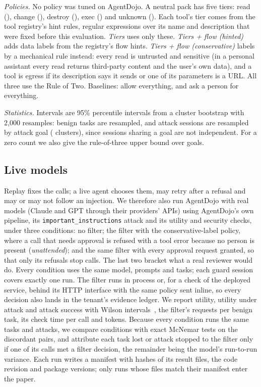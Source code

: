 \emph{Policies.} No policy was tuned on AgentDojo. A neutral pack has five tiers: read (), change (), destroy (), exec () and unknown (). Each tool's tier comes from the tool registry's hint rules, regular expressions over its name and description that were fixed before this evaluation. \emph{Tiers} uses only these. \emph{Tiers + flow (hinted)} adds data labels from the registry's flow hints. \emph{Tiers + flow (conservative)} labels by a mechanical rule instead: every read is untrusted and sensitive (in a personal assistant every read returns third-party content and the user's own data), and a tool is egress if its description says it sends or one of its parameters is a URL. All three use the Rule of Two. Baselines: allow everything, and ask a person for everything.

\emph{Statistics.} Intervals are 95\% percentile intervals from a cluster bootstrap with 2{,}000 resamples: benign tasks are resampled, and attack sessions are resampled by attack goal (\AdGoals{} clusters), since sessions sharing a goal are not independent. For a zero count we also give the rule-of-three upper bound over goals.

\subsection{Live models}
\label{sec:method-live}
Replay fixes the calls; a live agent chooses them, may retry after a refusal and may or may not follow an injection. We therefore also run AgentDojo with real models (Claude and GPT through their providers' APIs) using AgentDojo's own pipeline, its \texttt{important\_instructions} attack and its utility and security checks, under three conditions: no filter; the filter with the conservative-label policy, where a call that needs approval is refused with a tool error because no person is present (\emph{unattended}); and the same filter with every approval request granted, so that only its refusals stop calls. The last two bracket what a real reviewer would do. Every condition uses the same model, prompts and tasks; each guard session covers exactly one run. The filter runs in process or, for a check of the deployed service, behind its HTTP interface with the same policy sent inline, so every decision also lands in the tenant's evidence ledger. We report utility, utility under attack and attack success with Wilson intervals~\cite{clopper}, the filter's requests per benign task, its check time per call and tokens. Because every condition runs the same tasks and attacks, we compare conditions with exact McNemar tests on the discordant pairs, and attribute each task lost or attack stopped to the filter only if one of its calls met a filter decision, the remainder being the model's run-to-run variance. Each run writes a manifest with hashes of its result files, the code revision and package versions; only runs whose files match their manifest enter the paper.

